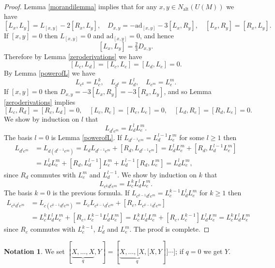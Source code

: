 \documentclass{amsart}
\theoremstyle{plain}
\theoremstyle{definition}
\newtheorem{notation}[lemma]{Notation}
\begin{document}
\begin{proof}
Lemma \ref{morandilemma} implies that for any $x, y \in N_{\mathrm{alt}}(U(M))$
we have
  \[
  [L_x, L_y] = L_{[x,y]} - 2 [R_x, L_y],
  \quad
  D_{x,y}= -\mathrm{ad}_{[x,y]} - 3 [L_x, R_y],
  \quad
  [L_x, R_y] = [R_x, L_y].
  \]
If $[x,y] = 0$ then $L_{[x,y]} = 0$ and $\mathrm{ad}_{[x,y]} = 0$, and hence
  \[
  [ L_x, L_y ] = \tfrac23 D_{x,y}.
  \]
Therefore by Lemma \ref{zeroderivations} we have
  \[
  [ L_c, L_d ] = [ L_c, L_e ] = [ L_d, L_e ] = 0.
  \]
By Lemma \ref{powerofL} we have
  \[
  L_{c^k} = L^k_c,
  \quad
  L_{d^l} = L^l_d,
  \quad
  L_{e^m} = L^m_e.
  \]
If $[x,y] = 0$ then $D_{x,y} = -3 [ L_x, R_y ] = -3 [ R_x, L_y ]$, and so Lemma
\ref{zeroderivations} implies
  \[
  [ L_c, R_d ] = [ R_c, L_d ] = 0,
  \quad
  [ L_c, R_e ] = [ R_c, L_e ] = 0,
  \quad
  [ L_d, R_e ] = [ R_d, L_e ] = 0.
  \]
We show by induction on $l$ that
  \[
  L_{ d^l e^m } = L_d^l L_e^m.
  \]
The basis $l = 0$ is Lemma \ref{powerofL}. If $L_{d^{l-1} e^m} = L^{l-1}_d
L^m_e$ for some $l \ge 1$ then
  \allowdisplaybreaks
  \begin{align*}
  L_{ d^l e^m }
  &=
  L_{ d ( d^{l-1}e^m ) }
  =
  L_d  L_{ d^{l-1} e^m } + [ R_d, L_{d^{l-1} e^m} ]
  =
  L_d^l L_e^m + [ R_d, L_d^{l-1} L_e^m ]
  \\
  &=
  L_d^l L_e^m + [ R_d, L_d^{l-1} ] L_e^m + L_d^{l-1} [ R_d, L_e^m ]
  =
  L_d^l L_e^m,
  \end{align*}
since $R_d$ commutes with $L_e^m$ and $L_d^{l-1}$. We show by induction on $k$
that
  \[
  L_{c^k d^l e^m}= L^k_c L^l_d L^m_e.
  \]
The basis $k = 0$ is the previous formula. If $ L_{c^{k-1} d^l e^m}= L^{k-1}_c
L^l_d L^m_e$ for $k \ge 1$ then
  \allowdisplaybreaks
  \begin{align*}
  L_{c^k d^l e^m }
  &=
  L_{ c ( c^{k-1} d^le^m ) }
  =
  L_c  L_{c^{k-1} d^l e^m } + [ R_c, L_{c^{k-1} d^l e^m} ]
  \\
  &=
  L_c^k L_d^l L_e^m + [ R_c, L_c^{k-1} L_d^l L_e^m ]
  =
  L_c^k L_d^l L_e^m + [ R_c, L_c^{k-1} ] L_d^l L_e^m
  =
  L_c^k L_d^l L_e^m
  \end{align*} since $R_c$ commutes with $L^{k-1}_c$, $L^l_d$ and $L^m_e$.
The proof is complete.
\end{proof}

\begin{notation}
We set $[ \underbrace{ X, \dots, X }_q, Y ] = [ \underbrace{ X, \hdots, [ X, [
X}_q, Y ] ] \cdots ]$; if $q = 0$ we get $Y$.
\end{notation}
\end{document}
